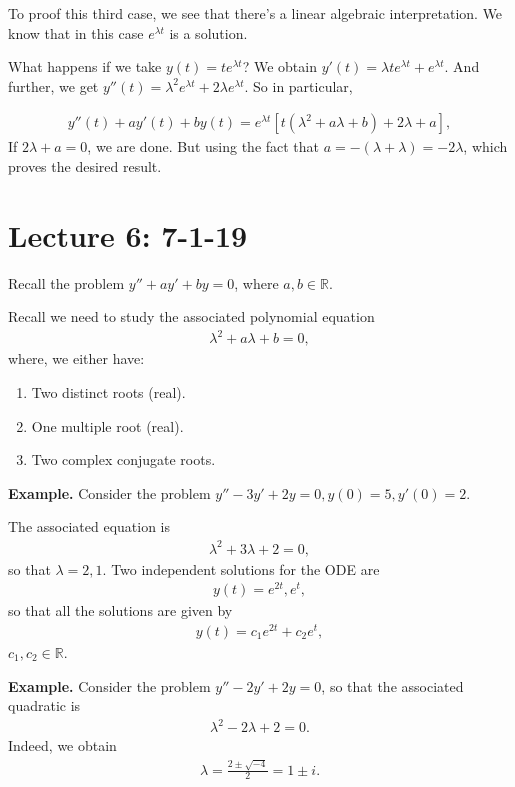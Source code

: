 \documentclass{article}
\newcommand{\RR}{\mathbb{R}}
\begin{document}
To proof this third case, we see that there's a linear algebraic interpretation.  We know that in this case $e^{\lambda t}$ is a solution.  

What happens if we take $y(t)= t e^{\lambda t}$?  We obtain $y'(t) = \lambda t e^{\lambda t} + e^{\lambda t}$.  And further, we get $y''(t) = \lambda^2  e^{\lambda t} + 2 \lambda e^{\lambda t}$.  So in particular,

\begin{align*}
  y''(t) + a y'(t) + b y(t) = e^{\lambda t} \left[ t (\lambda^2 + a \lambda + b) + 2\lambda + a \right],
\end{align*}
If $2 \lambda + a = 0$, we are done.  But using the fact that $a = - (\lambda + \lambda) = - 2 \lambda$, which proves the desired result.

\section{Lecture 6: 7-1-19}

Recall the problem $y'' + ay' + by = 0$, where $a, b \in \RR$.

Recall we need to study the associated polynomial equation
\begin{align*}
  \lambda^2 + a\lambda + b = 0,
\end{align*}
where, we either have:

\begin{enumerate}
  \item Two distinct roots (real).
  \item One multiple root (real).
  \item Two complex conjugate roots.
\end{enumerate}

{\bf Example.} Consider the problem $y'' - 3y' + 2y = 0, y(0) = 5, y'(0) = 2$.

The associated equation is 
\begin{align*}
  \lambda^2 + 3 \lambda + 2 = 0,
\end{align*}
so that $\lambda = 2, 1$.  Two independent solutions for the ODE are
\begin{align*}
  y(t) = e^{2t}, e^t,
\end{align*}
so that all the solutions are given by
\begin{align*}
  y(t) = c_1 e^{2t} + c_2 e^t,
\end{align*}
$c_1, c_2 \in \RR$.

{\bf Example.} Consider the problem $y'' - 2y' + 2y = 0$, so that the associated quadratic is
\begin{align*}
  \lambda^2 - 2\lambda + 2  = 0.
\end{align*}
Indeed, we obtain
\begin{align*}
  \lambda = \frac{2 \pm \sqrt{-4}}{2} = 1 \pm i.
\end{align*}
\end{document}
